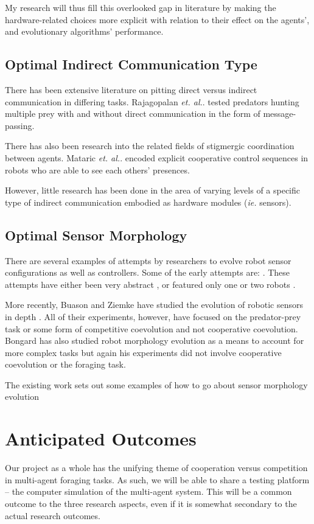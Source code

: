 \documentclass[a4paper,12pt]{article}
\begin{document}
My research will thus fill this overlooked gap in literature by making the hardware-related choices more explicit with relation to their effect on the agents’, and evolutionary algorithms’ performance.

\subsection{Optimal Indirect Communication Type}
There has been extensive literature on pitting direct versus indirect communication in differing tasks. Rajagopalan \textit{et. al.}. tested predators hunting multiple prey with and without direct communication in the form of message-passing. \cite{Rajagopalan11}

There has also been research into the related fields of stigmergic coordination between agents. Mataric \textit{et. al.}. encoded explicit cooperative control sequences in robots who are able to see each others’ presences. \cite{Werger99}

However, little research has been done in the area of varying levels of a specific type of indirect communication embodied as hardware modules (\textit{ie.} sensors).


\subsection{Optimal Sensor Morphology}
There are several examples of attempts by researchers to evolve robot sensor configurations as well as controllers. Some of the early attempts are: \cite{Sims94,Balakrishnan96,Lee:1996}. These attempts have either been very abstract \cite{Balakrishnan96}, or featured only one or two robots \cite{Sims94}.

More recently, Buason and Ziemke have studied the evolution of robotic sensors in depth \cite{Buason:2003, Buason:2005}. All of their experiments, however, have focused on the predator-prey task or some form of competitive coevolution and not cooperative coevolution. Bongard has also studied robot morphology evolution as a means to account for more complex tasks \cite{Bongard:2009,Bongard:2010} but again his experiments did not involve cooperative coevolution or the foraging task.

The existing work sets out some examples of how to go about sensor morphology evolution

\section{Anticipated Outcomes}
Our project as a whole has the unifying theme of cooperation versus competition in multi-agent foraging tasks. As such, we will be able to share a testing platform -- the computer simulation of the multi-agent system. This will be a common outcome to the three research aspects, even if it is somewhat secondary to the actual research outcomes.
\end{document}
